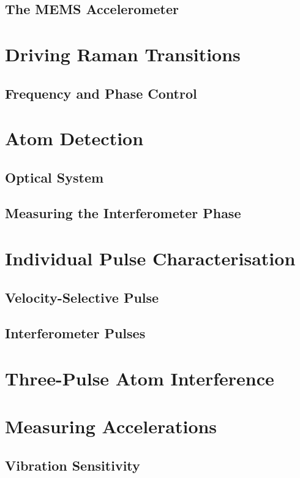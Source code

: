 \subsection{The MEMS Accelerometer}\label{subsec:raman_mems}

\section{Driving Raman Transitions}
\subsection{Frequency and Phase Control}\label{subsec:msquared_comm}

\section{Atom Detection}
\subsection{Optical System}
\subsection{Measuring the Interferometer Phase}

\section{Individual Pulse Characterisation} \label{sec:atomint_rabiosc}
\subsection{Velocity-Selective Pulse}
\subsection{Interferometer Pulses}

\section{Three-Pulse Atom Interference} \label{sec:atomint_threepulse}

\section{Measuring Accelerations}\label{sec:atomint_accelerations}
\subsection{Vibration Sensitivity}